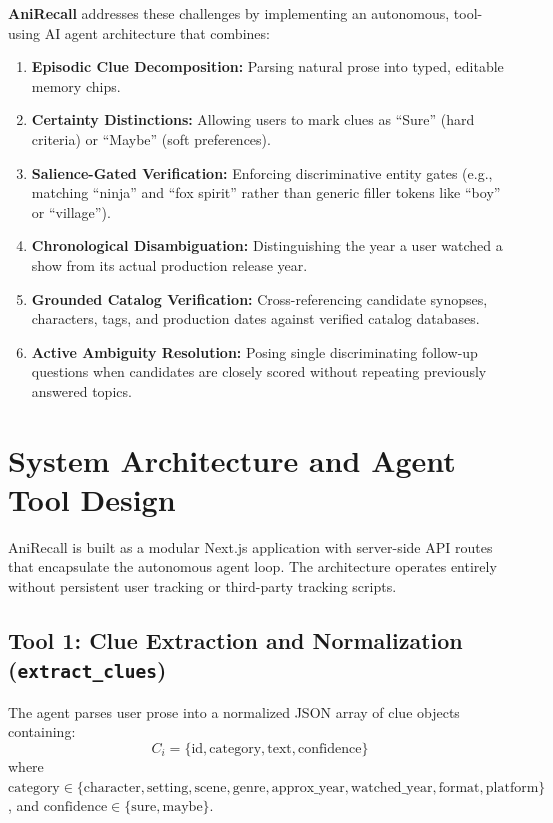 \documentclass[11pt,a4paper]{article}
\begin{document}
\textbf{AniRecall} addresses these challenges by implementing an autonomous, tool-using AI agent architecture that combines:
\begin{enumerate}[noitemsep]
    \item \textbf{Episodic Clue Decomposition:} Parsing natural prose into typed, editable memory chips.
    \item \textbf{Certainty Distinctions:} Allowing users to mark clues as ``Sure'' (hard criteria) or ``Maybe'' (soft preferences).
    \item \textbf{Salience-Gated Verification:} Enforcing discriminative entity gates (e.g., matching ``ninja'' and ``fox spirit'' rather than generic filler tokens like ``boy'' or ``village'').
    \item \textbf{Chronological Disambiguation:} Distinguishing the year a user watched a show from its actual production release year.
    \item \textbf{Grounded Catalog Verification:} Cross-referencing candidate synopses, characters, tags, and production dates against verified catalog databases.
    \item \textbf{Active Ambiguity Resolution:} Posing single discriminating follow-up questions when candidates are closely scored without repeating previously answered topics.
\end{enumerate}

\section{System Architecture and Agent Tool Design}
\label{sec:architecture}

AniRecall is built as a modular Next.js application with server-side API routes that encapsulate the autonomous agent loop. The architecture operates entirely without persistent user tracking or third-party tracking scripts.

\subsection{Tool 1: Clue Extraction and Normalization (\texttt{extract\_clues})}
The agent parses user prose into a normalized JSON array of clue objects containing:
\begin{equation}
C_i = \{ \text{id}, \text{category}, \text{text}, \text{confidence} \}
\end{equation}
where $\text{category} \in \{\text{character}, \text{setting}, \text{scene}, \text{genre}, \text{approx\_year}, \text{watched\_year}, \text{format}, \text{platform}\}$, and $\text{confidence} \in \{\text{sure}, \text{maybe}\}$.
\end{document}
